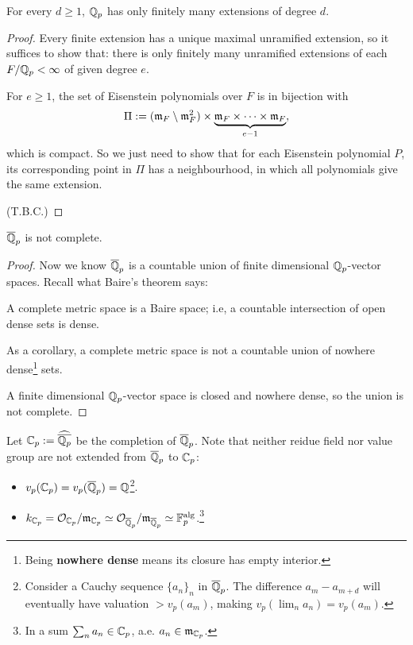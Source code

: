 \begin{theorem}
    For every $d\ge 1$, $\mathbb{Q}_p$ has only finitely many extensions of degree $d$.
\end{theorem}
\begin{proof}
    Every finite extension has a unique maximal unramified extension, so it suffices to show that: there is only finitely many unramified extensions of each $F/\mathbb{Q}_p < \infty$ of given degree $e$.

    For $e\ge 1$, the set of Eisenstein polynomials over $F$ is in bijection with \[\Pi := (\mathfrak{m}_F\setminus\mathfrak{m}_F^2)\times \underbrace{\mathfrak{m}_F\times\dots\times\mathfrak{m}_F}_{e-1},\]
    which is compact.
    So we just need to show that for each Eisenstein polynomial $P$, its corresponding point in $\Pi$ has a neighbourhood, in which all polynomials give the same extension.

    (T.B.C.)
\end{proof}

\begin{corollary}
    $\overline{\mathbb{Q}}_p$ is not complete.
\end{corollary}
\begin{proof}
    Now we know $\overline{\mathbb{Q}}_p$ is a countable union of finite dimensional $\mathbb{Q}_p$-vector spaces.
    Recall what Baire's theorem says:
    \begin{theorem}
        \label{Baire thm}
        A complete metric space is a Baire space;
        i.e, a countable intersection of open dense sets is dense.

        As a corollary, a complete metric space is not a countable union of nowhere dense\footnote{Being \textbf{nowhere dense} means its closure has empty interior.} sets.
    \end{theorem}
    A finite dimensional $\mathbb{Q}_p$-vector space is closed and nowhere dense, so the union is not complete.
\end{proof}

Let $\mathbb{C}_p := \widehat{\overline{\mathbb{Q}_p}}$ be the completion of $\overline{\mathbb{Q}}_p$.
Note that neither reidue field nor value group are not extended from $\overline{\mathbb{Q}}_p$ to $\mathbb{C}_p$:
\begin{itemize}
    \item $v_p(\mathbb{C}_p) = v_p(\overline{\mathbb{Q}}_p) = \mathbb{Q}$\footnote{
        Consider a Cauchy sequence $\{a_n\}_n$ in $\overline{\mathbb{Q}}_p$.
        The difference $a_m-a_{m + d}$ will eventually have valuation $>v_p(a_m)$,
        making $v_p(\lim_{n}a_n) = v_p(a_m)$.
    }.
    \item $k_{\mathbb{C}_p} = \mathcal{O}_{\mathbb{C}_p}/\mathfrak{m}_{\mathbb{C}_p}\simeq\mathcal{O}_{\overline{\mathbb{Q}}_p}/\mathfrak{m}_{\overline{\mathbb{Q}}_p}\simeq\mathbb{F}_p^{\mathrm{alg}}$.\footnote{
        In a sum $\sum_n a_n\in\mathbb{C}_p$,
        a.e. $a_n\in\mathfrak{m}_{\mathbb{C}_p}$. 
    }
\end{itemize}

